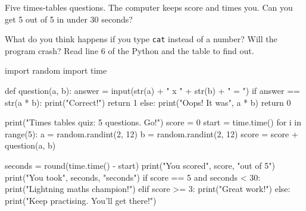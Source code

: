 
Five times-tables questions. The computer keeps score and times you. Can you get 5 out of 5 in under 30 seconds?

\begin{center}
\begin{scratch}
\end{scratch}
\end{center}

\begin{think}
What do you think happens if you type \texttt{cat} instead of a number? Will the program crash? Read line 6 of the Python and the table to find out.
\end{think}

\begin{typethis}
import random
import time

def question(a, b):
    answer = input(str(a) + " x " + str(b) + " = ")
    if answer == str(a * b):
        print("Correct!")
        return 1
    else:
        print("Oops! It was", a * b)
        return 0

print("Times tables quiz: 5 questions. Go!")
score = 0
start = time.time()
for i in range(5):
    a = random.randint(2, 12)
    b = random.randint(2, 12)
    score = score + question(a, b)

seconds = round(time.time() - start)
print("You scored", score, "out of 5")
print("You took", seconds, "seconds")
if score == 5 and seconds < 30:
    print("Lightning maths champion!")
elif score >= 3:
    print("Great work!")
else:
    print("Keep practising. You'll get there!")
\end{typethis}

